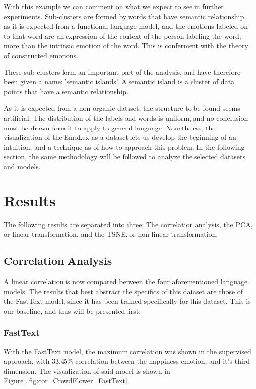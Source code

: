 With this example we can comment on what we expect to see in further experiments. Sub-clusters are formed by words that have semantic relationship, as it is expected from a functional language model, and the emotions labeled on to that word are an expression of the context of the person labeling the word, more than the intrinsic emotion of the word. This is conferment with the theory of constructed emotions.

These sub-clusters form an important part of the analysis, and have therefore been given a name: 'semantic islands'. A semantic island is a cluster of data points that have a semantic relationship.

As it is expected from a non-organic dataset, the structure to be found seems artificial. The distribution of the labels and words is uniform, and no conclusion must be drawn form it to apply to general language. Nonetheless, the visualization of the EmoLex as a dataset lets us develop the beginning of an intuition, and a technique as of how to approach this problem. In the following section, the same methodology will be followed to analyze the selected datasets and models.



\section{Results}\label{sec:Results}

The following results are separated into three: The correlation analysis, the PCA, or linear transformation, and the TSNE, or non-linear transformation.

\subsection{Correlation Analysis}\label{sub:Correlation Analysis}
A linear correlation is now compared between the four aforementioned language models. The results that best abstract the specifics of this dataset are those of the FastText model, since it has been trained specifically for this dataset. This is our baseline, and thus will be presented first:


\subsubsection{FastText}
With the FastText model, the maximum correlation was shown in the supervised approach, with 33.45\% correlation between the happiness emotion, and it's third dimension. The visualization of said model is shown in Figure~\ref{fig:cor_CrowdFlower_FastText}.

